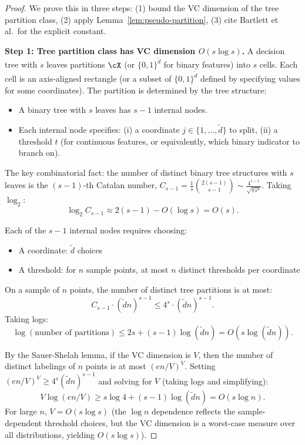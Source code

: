 \documentclass[12pt]{article}
\begin{document}
\begin{proof}
We prove this in three steps: (1) bound the VC dimension of the tree partition class, (2) apply Lemma~\ref{lem:pseudo-partition}, (3) cite Bartlett et al.\ for the explicit constant.

\noindent\textbf{Step 1: Tree partition class has VC dimension $O(s \log s)$.}
A decision tree with $s$ leaves partitions $\cX$ (or $\{0,1\}^{\tilde{d}}$ for binary features) into $s$ cells. Each cell is an axis-aligned rectangle (or a subset of $\{0,1\}^{\tilde{d}}$ defined by specifying values for some coordinates). The partition is determined by the tree structure:
\begin{itemize}
\item A binary tree with $s$ leaves has $s-1$ internal nodes.
\item Each internal node specifies: (i) a coordinate $j \in \{1,\ldots,\tilde{d}\}$ to split, (ii) a threshold $t$ (for continuous features, or equivalently, which binary indicator to branch on).
\end{itemize}

The key combinatorial fact: the number of distinct binary tree structures with $s$ leaves is the $(s-1)$-th Catalan number, $C_{s-1} = \frac{1}{s}\binom{2(s-1)}{s-1} \sim \frac{4^{s-1}}{\sqrt{\pi s^3}}$. Taking $\log_2$:
\[
\log_2 C_{s-1} \approx 2(s-1) - O(\log s) = O(s).
\]

Each of the $s-1$ internal nodes requires choosing:
\begin{itemize}
\item A coordinate: $\tilde{d}$ choices
\item A threshold: for $n$ sample points, at most $n$ distinct thresholds per coordinate
\end{itemize}

On a sample of $n$ points, the number of distinct tree partitions is at most:
\[
C_{s-1} \cdot (\tilde{d} n)^{s-1} \le 4^s \cdot (\tilde{d} n)^{s-1}.
\]
Taking logs:
\[
\log(\text{number of partitions}) \le 2s + (s-1) \log(\tilde{d} n) = O(s \log(\tilde{d} n)).
\]

By the Sauer-Shelah lemma, if the VC dimension is $V$, then the number of distinct labelings of $n$ points is at most $(en/V)^V$. Setting $(en/V)^V \ge 4^s (\tilde{d} n)^{s-1}$ and solving for $V$ (taking logs and simplifying):
\[
V \log(en/V) \ge s \log 4 + (s-1) \log(\tilde{d} n) = O(s \log n).
\]
For large $n$, $V = O(s \log s)$ (the $\log n$ dependence reflects the sample-dependent threshold choices, but the VC dimension is a worst-case measure over all distributions, yielding $O(s \log s)$).


\end{proof}
\end{document}
